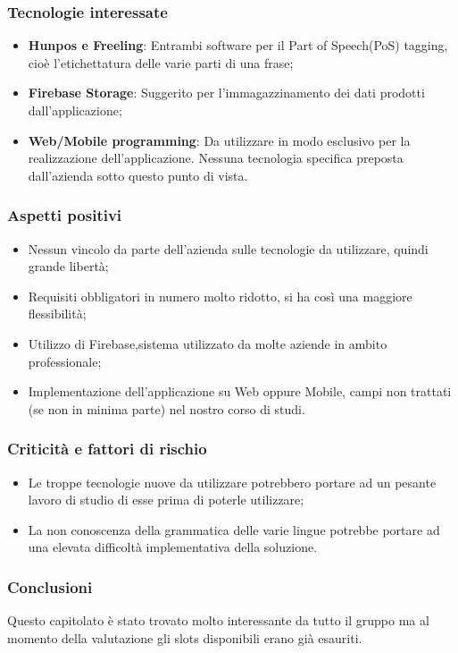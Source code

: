 \subsubsection{Tecnologie interessate}
\begin{itemize}
	\item \textbf{Hunpos e Freeling}: Entrambi software per il Part of Speech(PoS) tagging, cioè l'etichettatura delle varie parti di una frase;
	\item \textbf{Firebase Storage}: Suggerito per l'immagazzinamento dei dati prodotti dall'applicazione;
	\item \textbf{Web/Mobile programming}: Da utilizzare in modo esclusivo per la realizzazione dell'applicazione. Nessuna tecnologia specifica preposta dall'azienda sotto questo punto di vista.
\end{itemize}
\subsubsection{Aspetti positivi}
\begin{itemize}
	\item Nessun vincolo da parte dell'azienda sulle tecnologie da utilizzare, quindi grande libertà;
	\item Requisiti obbligatori in numero molto ridotto, si ha così una maggiore flessibilità;
	\item Utilizzo di Firebase,sistema utilizzato da molte aziende in ambito professionale;
	\item Implementazione dell'applicazione su Web oppure Mobile, campi non trattati (se non in minima parte) nel nostro corso di studi. 
\end{itemize}
\subsubsection{Criticità e fattori di rischio}
\begin{itemize}
\item Le troppe tecnologie nuove da utilizzare potrebbero portare ad un pesante lavoro di studio di esse prima di poterle utilizzare;
\item La non conoscenza della grammatica delle varie lingue potrebbe portare ad una elevata difficoltà implementativa della soluzione.
\end{itemize}
\subsubsection{Conclusioni}
Questo capitolato è stato trovato molto interessante da tutto il gruppo ma al momento della valutazione gli slots disponibili erano già esauriti.